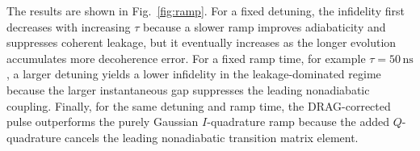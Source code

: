 \begin{appendices}
The results are shown in Fig.~\ref{fig:ramp}. For a fixed detuning, the infidelity first decreases with increasing $\tau$ because a slower ramp improves adiabaticity and suppresses coherent leakage, but it eventually increases as the longer evolution accumulates more decoherence error. For a fixed ramp time, for example $\tau=50\,\mathrm{ns}$, a larger detuning yields a lower infidelity in the leakage-dominated regime because the larger instantaneous gap suppresses the leading nonadiabatic coupling. Finally, for the same detuning and ramp time, the DRAG-corrected pulse outperforms the purely Gaussian $I$-quadrature ramp because the added $Q$-quadrature cancels the leading nonadiabatic transition matrix element.
\end{appendices}